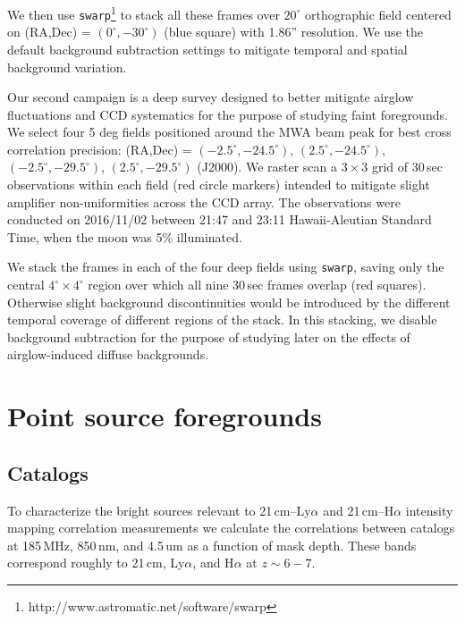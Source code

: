 \documentclass[preprint]{aastex}
\begin{document}
We then use {\tt swarp}\footnote{http://www.astromatic.net/software/swarp} \citep{swarp} to stack all these frames over $20^\circ$ orthographic field centered on (RA,Dec) = $(0^\circ,-30^\circ)$ (blue square) with 1.86'' resolution. We use the default background subtraction settings to mitigate temporal and spatial background variation. 


Our second campaign is a deep survey designed to better mitigate airglow fluctuations and CCD systematics for the purpose of studying faint foregrounds. We select four 5 deg fields positioned around the MWA beam peak for best cross correlation precision: (RA,Dec) = $(-2.5^\circ, -24.5^\circ)$, $(2.5^\circ, -24.5^\circ)$, $(-2.5^\circ, -29.5^\circ)$, $(2.5^\circ, -29.5^\circ)$ (J2000). We raster scan a $3\times3$ grid of 30\,sec observations within each field (red circle markers) intended to mitigate slight amplifier non-uniformities across the CCD array. The observations were conducted on 2016/11/02 between 21:47 and 23:11 Hawaii-Aleutian Standard Time, when the moon was 5\% illuminated.

We stack the frames in each of the four deep fields using {\tt swarp}, saving only the central $4^\circ\times 4^\circ$ region over which all nine 30\,sec frames overlap (red squares). Otherwise slight background discontinuities would be introduced by the different temporal coverage of different regions of the stack. In this stacking, we disable background subtraction for the purpose of studying later on the effects of airglow-induced diffuse backgrounds.




\section{Point source foregrounds}

\subsection{Catalogs}

To characterize the bright sources relevant to 21\,cm--Ly$\alpha$ and  21\,cm--H$\alpha$ intensity mapping correlation measurements we calculate the correlations between catalogs at 185\,MHz, 850\,nm, and 4.5\,um as a function of mask depth. These bands correspond roughly to 21\,cm, Ly$\alpha$, and H$\alpha$ at $z\sim6-7$. 
\end{document}

